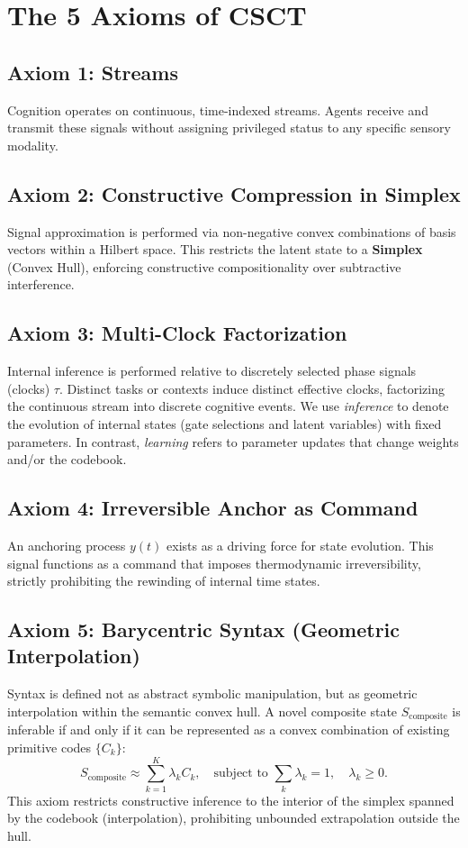 \documentclass{article}
\begin{document}
\section{The 5 Axioms of CSCT}

\subsection*{Axiom 1: Streams}
Cognition operates on continuous, time-indexed streams. Agents receive and transmit these signals without assigning privileged status to any specific sensory modality.

\subsection*{Axiom 2: Constructive Compression in Simplex}
Signal approximation is performed via non-negative convex combinations of basis vectors within a Hilbert space. This restricts the latent state to a \textbf{Simplex} (Convex Hull), enforcing constructive compositionality over subtractive interference.

\subsection*{Axiom 3: Multi-Clock Factorization}
Internal inference is performed relative to discretely selected phase signals (clocks) $\tau$. Distinct tasks or contexts induce distinct effective clocks, factorizing the continuous stream into discrete cognitive events.
We use \emph{inference} to denote the evolution of internal states (gate selections and latent variables) with fixed parameters.
In contrast, \emph{learning} refers to parameter updates that change weights and/or the codebook.

\subsection*{Axiom 4: Irreversible Anchor as Command}
An anchoring process $y(t)$ exists as a driving force for state evolution. This signal functions as a command that imposes thermodynamic irreversibility, strictly prohibiting the rewinding of internal time states.

\subsection*{Axiom 5: Barycentric Syntax (Geometric Interpolation)}
Syntax is defined not as abstract symbolic manipulation, but as geometric interpolation within the semantic convex hull.
A novel composite state $S_{\text{composite}}$ is inferable if and only if it can be represented as a convex combination of existing primitive codes $\{C_k\}$:
\begin{equation}
    S_{\text{composite}} \approx \sum_{k=1}^{K} \lambda_k C_k, \quad \text{subject to } \sum_k \lambda_k = 1, \quad \lambda_k \ge 0.
\end{equation}
This axiom restricts constructive inference to the interior of the simplex spanned by the codebook (interpolation), prohibiting unbounded extrapolation outside the hull.
\end{document}
